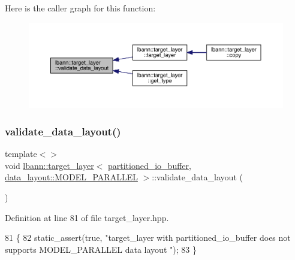 Here is the caller graph for this function\+:\nopagebreak
\begin{figure}[H]
\begin{center}
\leavevmode
\includegraphics[width=350pt]{classlbann_1_1target__layer_a34b7fe0522350d9fef731ae0642a8931_icgraph}
\end{center}
\end{figure}
\mbox{\label{classlbann_1_1target__layer_a00860943418bd3c473056ec959542a6e}} 
\subsubsection{\texorpdfstring{validate\+\_\+data\+\_\+layout()}{validate\_data\_layout()}\hspace{0.1cm}{\footnotesize\ttfamily [2/5]}}
{\footnotesize\ttfamily template$<$$>$ \\
void \hyperlink{classlbann_1_1target__layer}{lbann\+::target\+\_\+layer}$<$ \hyperlink{classlbann_1_1partitioned__io__buffer}{partitioned\+\_\+io\+\_\+buffer}, \hyperlink{base_8hpp_a786677cbfb3f5677b4d84f3056eb08dbac94d7b0e44ab8bdcdad694a673cdeae0}{data\+\_\+layout\+::\+M\+O\+D\+E\+L\+\_\+\+P\+A\+R\+A\+L\+L\+EL} $>$\+::validate\+\_\+data\+\_\+layout (\begin{DoxyParamCaption}{ }\end{DoxyParamCaption})\hspace{0.3cm}{\ttfamily [inline]}}



Definition at line 81 of file target\+\_\+layer.\+hpp.


\begin{DoxyCode}
81                                                                                                  \{
82   static\_assert(\textcolor{keyword}{true}, \textcolor{stringliteral}{"target\_layer with partitioned\_io\_buffer does not supports MODEL\_PARALLEL data layout
      "});
83 \}
\end{DoxyCode}
\mbox{\label{classlbann_1_1target__layer_a2e427388dd45925b3ae4b2479b6ff56c}} 
